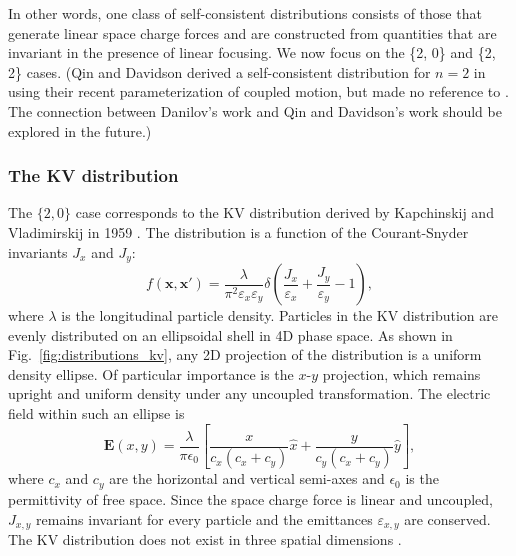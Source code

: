 In other words, one class of self-consistent distributions consists of those that generate linear space charge forces and are constructed from quantities that are invariant in the presence of linear focusing. We now focus on the \{2, 0\} and \{2, 2\} cases. (Qin and Davidson derived a self-consistent distribution for $n = 2$ in \cite{Qin2013} using their recent parameterization of coupled motion, but made no reference to \cite{Danilov2003}. The connection between Danilov's work and Qin and Davidson's work should be explored in the future.)


\subsubsection{The KV distribution}

The $\{2, 0\}$ case corresponds to the KV distribution derived by Kapchinskij and Vladimirskij in 1959 \cite{Kapchinskij1959}. The distribution is a function of the Courant-Snyder invariants $J_x$ and $J_y$:
%
\begin{equation}
    f(\mathbf{x}, \mathbf{x}') = \frac{\lambda}{\pi^2 \varepsilon_x\varepsilon_y}
    \delta \left(\frac{J_x}{\varepsilon_x} + \frac{J_y}{\varepsilon_y} -1 \right),
\end{equation}
%
where $\lambda$ is the longitudinal particle density. Particles in the KV distribution are evenly distributed on an ellipsoidal shell in 4D phase space. As shown in Fig.~\ref{fig:distributions_kv}, any 2D projection of the distribution is a uniform density ellipse. Of particular importance is the $x$-$y$ projection, which remains upright and uniform density under any uncoupled transformation. The electric field within such an ellipse is
%
\begin{equation}  \label{eq:field_in_upright_ellipse}
    \mathbf{E}(x, y) =
    \frac{\lambda}{\pi\epsilon_0}
    \left[ 
        \frac{x}{c_x\left(c_x+c_y\right)} \hat{x}
        + \frac{y}{c_y\left(c_x+c_y\right)} \hat{y}
    \right],
\end{equation}
%
where $c_x$ and $c_y$ are the horizontal and vertical semi-axes and $\epsilon_0$ is the permittivity of free space. Since the space charge force is linear and uncoupled, $J_{x,y}$ remains invariant for every particle and the emittances $\varepsilon_{x,y}$ are conserved. The KV distribution does not exist in three spatial dimensions \cite{Sacherer1968}.


